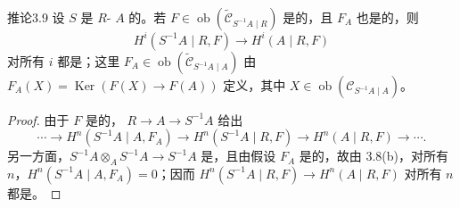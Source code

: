 \begin{SGAresult}{推论}{3.9}
设 $S$ 是 $R$- $A$ 的。若 $F\in\operatorname{ob}(\widetilde{\mathcal C}_{S^{-1}A\mid R})$ 是的，且 $F_A$ 也是的，则
\[H^i(S^{-1}A\mid R,F)\longrightarrow H^i(A\mid R,F)\]
对所有 $i$ 都是；这里 $F_A\in\operatorname{ob}(\widetilde{\mathcal C}_{S^{-1}A\mid A})$ 由 $F_A(X)=\operatorname{Ker}(F(X)\to F(A))$ 定义，其中 $X\in\operatorname{ob}(\mathcal C_{S^{-1}A\mid A})$。
\end{SGAresult}
\begin{proof}
由于 $F$ 是的， $R\to A\to S^{-1}A$ 给出
\[\cdots\to H^n(S^{-1}A\mid A,F_A)\to H^n(S^{-1}A\mid R,F)\to H^n(A\mid R,F)\to\cdots.\]
另一方面，$S^{-1}A\otimes_A S^{-1}A\to S^{-1}A$ 是，且由假设 $F_A$ 是的，故由 3.8(b)，对所有 $n$，$H^n(S^{-1}A\mid A,F_A)=0$；因而 $H^n(S^{-1}A\mid R,F)\to H^n(A\mid R,F)$ 对所有 $n$ 都是。
\end{proof}

